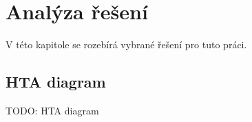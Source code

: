 \chapter{Analýza řešení}

V této kapitole se rozebírá vybrané řešení pro tuto práci.

\section{HTA diagram}

TODO: HTA diagram
